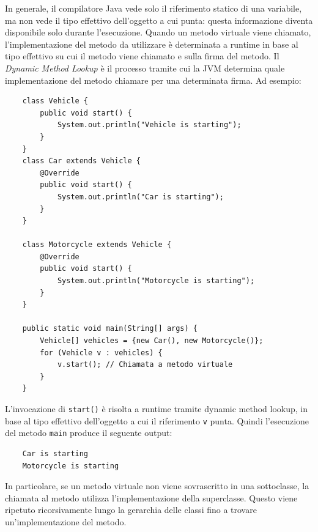 In generale, il compilatore Java vede solo il riferimento statico di una variabile, ma non vede il tipo effettivo dell'oggetto a cui punta: questa informazione diventa disponibile solo durante l'esecuzione. Quando un metodo virtuale viene chiamato, l'implementazione del metodo da utilizzare è determinata a runtime in base al tipo effettivo su cui il metodo viene chiamato e sulla firma del metodo. Il \textit{Dynamic Method Lookup} è il processo tramite cui la JVM determina quale implementazione del metodo chiamare per una determinata firma. Ad esempio:
\begin{verbatim}
    class Vehicle {
        public void start() {
            System.out.println("Vehicle is starting");
        }
    }
    class Car extends Vehicle {
        @Override
        public void start() {
            System.out.println("Car is starting");
        }
    }

    class Motorcycle extends Vehicle {
        @Override
        public void start() {
            System.out.println("Motorcycle is starting");
        }
    }

    public static void main(String[] args) {
        Vehicle[] vehicles = {new Car(), new Motorcycle()};
        for (Vehicle v : vehicles) {
            v.start(); // Chiamata a metodo virtuale
        }
    }
\end{verbatim}
L'invocazione di \texttt{start()} è risolta a runtime tramite dynamic method lookup, in base al tipo effettivo dell'oggetto a cui il riferimento \texttt{v} punta. Quindi l'esecuzione del metodo \texttt{main} produce il seguente output:
\begin{verbatim}
    Car is starting
    Motorcycle is starting
\end{verbatim}
In particolare, se un metodo virtuale non viene sovrascritto in una sottoclasse, la chiamata al metodo utilizza l'implementazione della superclasse. Questo viene ripetuto ricorsivamente lungo la gerarchia delle classi fino a trovare un'implementazione del metodo. 

